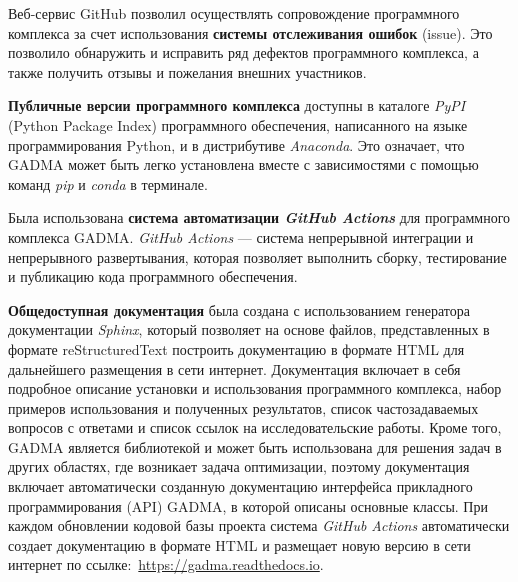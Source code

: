 
Веб-сервис GitHub позволил осуществлять сопровождение программного комплекса за счет использования \textbf{системы отслеживания ошибок} (issue).
Это позволило обнаружить и исправить ряд дефектов программного комплекса, а также получить отзывы и пожелания внешних участников.

\textbf{Публичные версии программного комплекса} доступны в каталоге \textit{PyPI} (Python Package Index) программного обеспечения, написанного на языке программирования Python, и в дистрибутиве \textit{Anaconda}.
Это означает, что GADMA может быть легко установлена вместе с зависимостями с помощью команд \textit{pip} и \textit{conda} в терминале.

Была использована \textbf{система автоматизации \textit{GitHub Actions}} для программного комплекса GADMA.
\textit{GitHub Actions} --- система непрерывной интеграции и непрерывного развертывания, которая позволяет выполнить сборку, тестирование и публикацию кода программного обеспечения.

\textbf{Общедоступная документация} была создана с использованием генератора документации \textit{Sphinx}, который позволяет на основе  файлов, представленных в формате reStructuredText построить документацию в формате HTML для дальнейшего размещения в сети интернет.
Документация включает в себя подробное описание установки и использования программного комплекса, набор примеров использования и полученных результатов, список частозадаваемых вопросов с ответами и список ссылок на исследовательские работы.
Кроме того, GADMA является библиотекой и может быть использована для решения задач в других областях, где возникает задача оптимизации, поэтому документация включает автоматически созданную документацию интерфейса прикладного программирования (API) GADMA, в которой описаны основные классы.
При каждом обновлении кодовой базы проекта система \textit{GitHub Actions} автоматически создает документацию в формате HTML и размещает новую версию в сети интернет по ссылке:~\url{https://gadma.readthedocs.io}.

